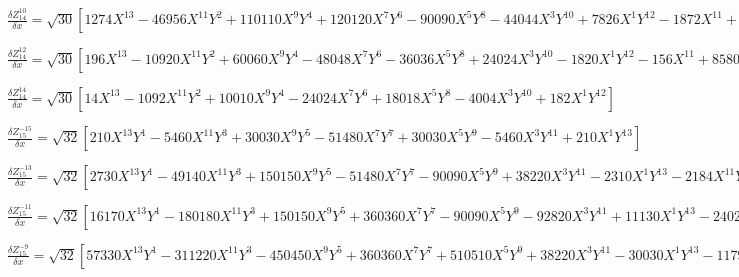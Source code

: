 \documentclass[10pt,landscape]{article}
\begin{document}
\vspace{1.2 mm}
\noindent $ \frac{\delta Z^{10}_{14}}{\delta x} = \sqrt{30} [1274X^{13} -46956X^{11}Y^{2} +110110X^{9}Y^{4} +120120X^{7}Y^{6} -90090X^{5}Y^{8} -44044X^{3}Y^{10} +7826X^{1}Y^{12} -1872X^{11} +68640X^{9}Y^{2} -205920X^{7}Y^{4} +102960X^{3}Y^{8} -13728X^{1}Y^{10} +660X^{9} -23760X^{7}Y^{2} +83160X^{5}Y^{4} -55440X^{3}Y^{6} +5940X^{1}Y^{8}] $

\vspace{1.2 mm}
\noindent $ \frac{\delta Z^{12}_{14}}{\delta x} = \sqrt{30} [196X^{13} -10920X^{11}Y^{2} +60060X^{9}Y^{4} -48048X^{7}Y^{6} -36036X^{5}Y^{8} +24024X^{3}Y^{10} -1820X^{1}Y^{12} -156X^{11} +8580X^{9}Y^{2} -51480X^{7}Y^{4} +72072X^{5}Y^{6} -25740X^{3}Y^{8} +1716X^{1}Y^{10}] $

\vspace{1.2 mm}
\noindent $ \frac{\delta Z^{14}_{14}}{\delta x} = \sqrt{30} [14X^{13} -1092X^{11}Y^{2} +10010X^{9}Y^{4} -24024X^{7}Y^{6} +18018X^{5}Y^{8} -4004X^{3}Y^{10} +182X^{1}Y^{12}] $

\vspace{1.2 mm}
\noindent $ \frac{\delta Z^{-15}_{15}}{\delta x} = \sqrt{32} [210X^{13}Y^{1} -5460X^{11}Y^{3} +30030X^{9}Y^{5} -51480X^{7}Y^{7} +30030X^{5}Y^{9} -5460X^{3}Y^{11} +210X^{1}Y^{13}] $

\vspace{1.2 mm}
\noindent $ \frac{\delta Z^{-13}_{15}}{\delta x} = \sqrt{32} [2730X^{13}Y^{1} -49140X^{11}Y^{3} +150150X^{9}Y^{5} -51480X^{7}Y^{7} -90090X^{5}Y^{9} +38220X^{3}Y^{11} -2310X^{1}Y^{13} -2184X^{11}Y^{1} +40040X^{9}Y^{3} -144144X^{7}Y^{5} +144144X^{5}Y^{7} -40040X^{3}Y^{9} +2184X^{1}Y^{11}] $

\vspace{1.2 mm}
\noindent $ \frac{\delta Z^{-11}_{15}}{\delta x} = \sqrt{32} [16170X^{13}Y^{1} -180180X^{11}Y^{3} +150150X^{9}Y^{5} +360360X^{7}Y^{7} -90090X^{5}Y^{9} -92820X^{3}Y^{11} +11130X^{1}Y^{13} -24024X^{11}Y^{1} +280280X^{9}Y^{3} -432432X^{7}Y^{5} -144144X^{5}Y^{7} +200200X^{3}Y^{9} -19656X^{1}Y^{11} +8580X^{9}Y^{1} -102960X^{7}Y^{3} +216216X^{5}Y^{5} -102960X^{3}Y^{7} +8580X^{1}Y^{9}] $

\vspace{1.2 mm}
\noindent $ \frac{\delta Z^{-9}_{15}}{\delta x} = \sqrt{32} [57330X^{13}Y^{1} -311220X^{11}Y^{3} -450450X^{9}Y^{5} +360360X^{7}Y^{7} +510510X^{5}Y^{9} +38220X^{3}Y^{11} -30030X^{1}Y^{13} -117936X^{11}Y^{1} +720720X^{9}Y^{3} +288288X^{7}Y^{5} -864864X^{5}Y^{7} -240240X^{3}Y^{9} +74256X^{1}Y^{11} +77220X^{9}Y^{1} -514800X^{7}Y^{3} +216216X^{5}Y^{5} +308880X^{3}Y^{7} -60060X^{1}Y^{9} -15840X^{7}Y^{1} +110880X^{5}Y^{3} -110880X^{3}Y^{5} +15840X^{1}Y^{7}] $
\end{document}
